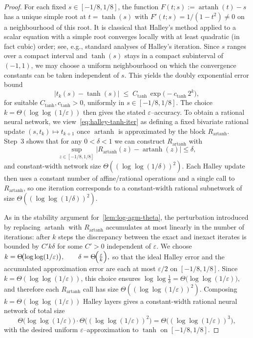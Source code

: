 \documentclass{article}
\theoremstyle{plain}
\theoremstyle{definition}
\theoremstyle{remark}
\begin{document}
\begin{proof}
For each fixed $s\in[-1/8,1/8]$, the function $F(t;s):=\operatorname{artanh}(t)-s$ has a unique simple root at $t=\tanh(s)$ with $F'(t;s)=1/(1-t^2)\neq 0$ on a neighbourhood of this root. It is classical that Halley’s method applied to a scalar equation with a simple root converges locally with at least quadratic (in fact cubic) order; see, e.g., standard analyses of Halley’s iteration. Since $s$ ranges over a compact interval and $\tanh(s)$ stays in a compact subinterval of $(-1,1)$, we may choose a uniform neighbourhood on which the convergence constants can be taken independent of $s$. This yields the doubly exponential error bound
\[
\bigl|t_k(s)-\tanh(s)\bigr|
\;\le\;
C_{\tanh}\,\exp\!\bigl(-c_{\tanh}\,2^k\bigr),
\]
for suitable $C_{\tanh},c_{\tanh}>0$, uniformly in $s\in[-1/8,1/8]$. The choice $k=\Theta(\log\log(1/\varepsilon))$ then gives the stated $\varepsilon$–accuracy. To obtain a rational neural network, we view~\cref{eq:halley-tanh-iter} as defining a fixed bivariate rational update
\(
(s,t_k)\longmapsto t_{k+1}
\)
once $\operatorname{artanh}$ is approximated by the block $R_{\operatorname{artanh}}$. Step~3 shows that for any $0<\delta<1$ we can construct $R_{\operatorname{artanh}}$ with
\[
\sup_{z\in[-1/8,1/8]}
\bigl|R_{\operatorname{artanh}}(z)-\operatorname{artanh}(z)\bigr|\le\delta,
\]
and constant-width network size $\Theta((\log\log(1/\delta))^2)$. Each Halley update then uses a constant number of affine/rational operations and a single call to $R_{\operatorname{artanh}}$, so one iteration corresponds to a constant-width rational subnetwork of size $\Theta((\log\log(1/\delta))^2)$.

As in the stability argument for~\cref{lem:log-agm-theta}, the perturbation introduced by replacing $\operatorname{artanh}$ with $R_{\operatorname{artanh}}$ accumulates at most linearly in the number of iterations: after $k$ steps the discrepancy between the exact and inexact iterates is bounded by $C' k \delta$ for some $C'>0$ independent of $\varepsilon$. We choose \(
k=\Theta\!\bigl(\log\log(1/\varepsilon)\bigr),
\qquad
\delta=\Theta\!\Bigl(\frac{\varepsilon}{k}\Bigr),
\) so that the ideal Halley error and the accumulated approximation error are each at most $\varepsilon/2$ on $[-1/8,1/8]$. Since $k=\Theta(\log\log(1/\varepsilon))$, this choice ensures \(
\log\log\frac{1}{\delta}
=
\Theta\!\bigl(\log\log(1/\varepsilon)\bigr),
\) and therefore each $R_{\operatorname{artanh}}$ call has size $\Theta((\log\log(1/\varepsilon))^2)$. Composing $k=\Theta(\log\log(1/\varepsilon))$ Halley layers gives a constant-width rational neural network of total size
\[
\Theta\!\bigl(\log\log(1/\varepsilon)\bigr)\cdot
\Theta\!\bigl((\log\log(1/\varepsilon))^2\bigr)
=
\Theta\!\bigl((\log\log(1/\varepsilon))^3\bigr),
\]
with the desired uniform $\varepsilon$–approximation to $\tanh$ on $[-1/8,1/8]$.
\end{proof}
\end{document}

